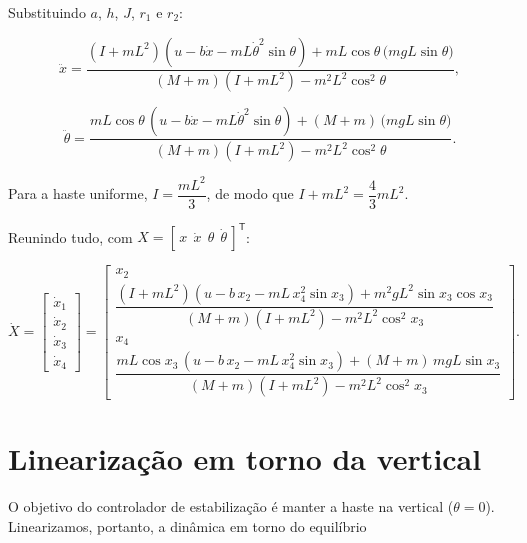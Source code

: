 \documentclass[brazil, 12pt]{article}
\begin{document}
Substituindo $a$, $h$, $J$, $r_1$ e $r_2$:

\[
\ddot{x} =
\frac{
\left(I+mL^{2}\right)\!\left(u - b\dot{x} - mL\dot{\theta}^{2}\sin\theta\right)
+ mL\cos\theta\,\big(mgL\sin\theta\big)
}{
(M+m)\left(I+mL^{2}\right) - m^{2}L^{2}\cos^{2}\theta
},
\]

\[
\ddot{\theta} =
\frac{
mL\cos\theta\,\!\left(u - b\dot{x} - mL\dot{\theta}^{2}\sin\theta\right)
+ (M+m)\,\big(mgL\sin\theta\big)
}{
(M+m)\left(I+mL^{2}\right) - m^{2}L^{2}\cos^{2}\theta
}.
\]

Para a haste uniforme, $I=\dfrac{mL^{2}}{3}$, de modo que $I+mL^{2}=\dfrac{4}{3}mL^{2}$.


Reunindo tudo, com $X=[\,x\ \ \dot{x}\ \ \theta\ \ \dot{\theta}\,]^{\mathsf T}$:

\[
\dot{X} =
\begin{bmatrix}
\dot{x}_1 \\[4pt] \dot{x}_2 \\[4pt] \dot{x}_3 \\[4pt] \dot{x}_4
\end{bmatrix}
=
\begin{bmatrix}
x_2 \\[6pt]
\dfrac{
\left(I+mL^{2}\right)\!\left(u - b\,x_2 - mL\,x_4^{2}\sin x_3\right)
+ m^{2}gL^{2}\sin x_3\cos x_3
}{
(M+m)\left(I+mL^{2}\right) - m^{2}L^{2}\cos^{2} x_3
} \\[16pt]
x_4 \\[6pt]
\dfrac{
mL\cos x_3\,\!\left(u - b\,x_2 - mL\,x_4^{2}\sin x_3\right)
+ (M+m)\,mgL\sin x_3
}{
(M+m)\left(I+mL^{2}\right) - m^{2}L^{2}\cos^{2} x_3
}
\end{bmatrix}.
\]

\vspace{0.3cm}

\section{Linearização em torno da vertical}
\label{sec:linearizacao}

O objetivo do controlador de estabilização é manter a haste na vertical
($\theta = 0$). Linearizamos, portanto, a dinâmica em torno do equilíbrio
\end{document}
